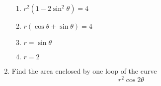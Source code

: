 \begin{enumerate}
\begin{multicols}{2}
    \begin{enumerate}[label=(\roman*)]
      \item \(r^2 (1- 2 \sin ^2 \theta) = 4\)
      \item \(r (\cos \theta + \sin \theta ) = 4\)
      \item \(r = \sin \theta\)
      \item \(r = 2 \)
    \end{enumerate}
  \end{multicols}

  \vspace{8em}

  \item Find the area enclosed by one loop of the curve
    \[%
    r^2 \cos 2\theta
    \]%

\end{enumerate}
